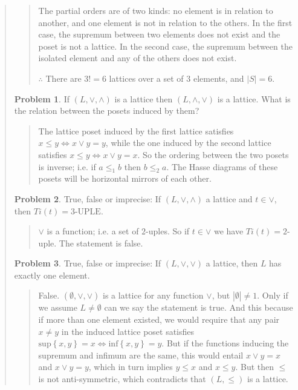 \documentclass[a4paper, 12pt]{article}
\theoremstyle{definition}
\newtheorem{problem}{Problem}
\theoremstyle{definition}
\theoremstyle{definition}
\begin{document}
\begin{quote}
\begin{quote}
    The partial orders are of two kinds: no element is in relation to another,
    and one element is not in relation to the others. In the first case, the
    supremum between two elements does not exist and the poset is not a
    lattice. In the second case, the supremum between the isolated element 
    and any of the others does not exist.

    $\therefore $ There are $3! = 6$ lattices over a set of $3$ elements,
    and $|S| = 6$.
\end{quote}
\normalsize

\begin{problem}
    If $(L, \lor , \land )$ is a lattice then $(L, \land , \lor )$ is a lattice.
    What is the relation between the posets induced by them?
\end{problem}


\small
\begin{quote}

The lattice poset induced by the first lattice satisfies $x \leq y \iff x \lor
y = y$, while the one induced by the second lattice satisfies $x \leq y \iff x
\lor  y = x $. So the ordering between the two posets is inverse; i.e. if $a
\leq_1 b$ then $b \leq_2 a$. The Hasse diagrams of these posets will be
horizontal mirrors of each other. 

\end{quote}
\normalsize

\begin{problem}
    True, false or imprecise: If $(L, \lor , \land) $ a lattice and $t \in \lor$,
    then $Ti(t) = 3\text{-UPLE}$.
\end{problem}


\small
\begin{quote}

    $\lor $ is a function; i.e. a set of $2$-uples. So if $t \in \lor $
    we have $Ti(t) = 2$-uple. The statement is false.

\end{quote}
\normalsize


\begin{problem}
    True, false or imprecise: If $(L, \lor , \lor ) $ a lattice, 
    then $L$ has exactly one element.
\end{problem}


\small
\begin{quote}

    False. $(\emptyset, \lor , \lor)$ is a lattice for any function $\lor$, but
    $|\emptyset| \neq 1$. Only if we assume $L \neq \emptyset$ can we say the
    statement is true. And this because if more than one element existed, we
    would require that any pair $x \neq y$ in the induced lattice poset
    satisfies $\text{sup}\left\{ x, y \right\} = x \iff \text{inf}\left\{ x, y
    \right\} = y $. But if the functions inducing the supremum and infimum are the same, 
    this would entail $x \lor  y = x$ and $x \lor y = y$, which in turn implies
    $y \leq x$ and $x \leq y$. But then $\leq$ is not anti-symmetric, which 
    contradicts that $(L, \leq)$ is a lattice.


\end{quote}
\end{quote}
\end{document}
